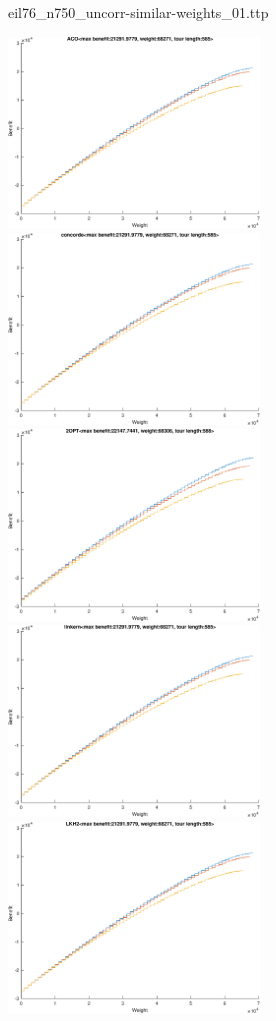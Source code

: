 \documentclass{article}
\begin{document}
\newpage
eil76\_n750\_uncorr-similar-weights\_01.ttp

\noindent
\includegraphics[width=0.5\textwidth]{eil76figs/eil76_n750_uncorr-similar-weights_01.ttp.aco.txt.atsf.eps}
\includegraphics[width=0.5\textwidth]{eil76figs/eil76_n750_uncorr-similar-weights_01.ttp.con.txt.atsf.eps}
\includegraphics[width=0.5\textwidth]{eil76figs/eil76_n750_uncorr-similar-weights_01.ttp.inv.txt.atsf.eps}
\includegraphics[width=0.5\textwidth]{eil76figs/eil76_n750_uncorr-similar-weights_01.ttp.lkh.txt.atsf.eps}
\includegraphics[width=0.5\textwidth]{eil76figs/eil76_n750_uncorr-similar-weights_01.ttp.lkh2.txt.atsf.eps}
\end{document}
